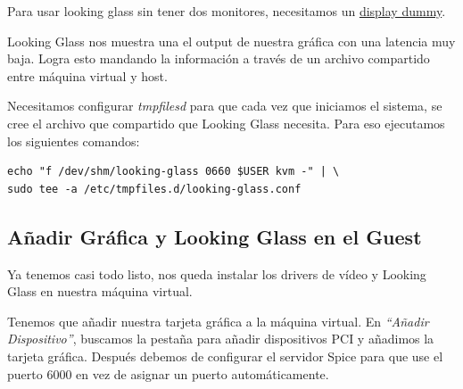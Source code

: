 \documentclass[12pt]{article}
\begin{document}
Para usar looking glass sin tener dos monitores, necesitamos un \href{https://www.amazon.com/s?k=display+dummy}{display dummy}.

\medskip
Looking Glass nos muestra una el output de nuestra gráfica con una latencia muy baja. Logra esto mandando la información a través de un archivo compartido entre máquina virtual y host.

\medskip
Necesitamos configurar \emph{tmpfilesd} para que cada vez que iniciamos el sistema, se cree el archivo que compartido que Looking Glass necesita. Para eso ejecutamos los siguientes comandos:

\begin{verbatim}
echo "f /dev/shm/looking-glass 0660 $USER kvm -" | \
sudo tee -a /etc/tmpfiles.d/looking-glass.conf
\end{verbatim}

\subsection{Añadir Gráfica y Looking Glass en el Guest}

Ya tenemos casi todo listo, nos queda instalar los drivers de vídeo y Looking Glass en nuestra máquina virtual.

\medskip
Tenemos que añadir nuestra tarjeta gráfica a la máquina virtual. En \emph{``Añadir Dispositivo''}, buscamos la pestaña para añadir dispositivos PCI y añadimos la tarjeta gráfica.
Después debemos de configurar el servidor Spice para que use el puerto 6000 en vez de asignar un puerto automáticamente.
\end{document}
